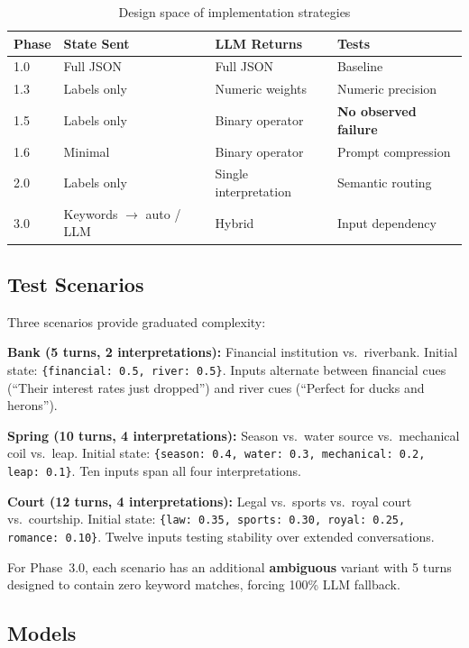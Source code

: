 \documentclass[11pt,a4paper]{article}
\begin{document}
\begin{table}[ht]
\centering
\begin{tabular}{llll}
\toprule
\textbf{Phase} & \textbf{State Sent} & \textbf{LLM Returns} & \textbf{Tests} \\
\midrule
1.0 & Full JSON & Full JSON & Baseline \\
1.3 & Labels only & Numeric weights & Numeric precision \\
1.5 & Labels only & Binary operator & \textbf{No observed failure} \\
1.6 & Minimal & Binary operator & Prompt compression \\
2.0 & Labels only & Single interpretation & Semantic routing \\
3.0 & Keywords $\to$ auto / LLM & Hybrid & Input dependency \\
\bottomrule
\end{tabular}
\caption{Design space of implementation strategies}
\label{tab:design_space}
\end{table}

\subsection{Test Scenarios}

Three scenarios provide graduated complexity:

\textbf{Bank (5 turns, 2 interpretations):}
Financial institution vs.\ riverbank. Initial state:
\texttt{\{financial: 0.5, river: 0.5\}}. Inputs alternate between financial cues
(``Their interest rates just dropped'') and river cues (``Perfect for ducks and herons'').

\textbf{Spring (10 turns, 4 interpretations):}
Season vs.\ water source vs.\ mechanical coil vs.\ leap. Initial state:
\texttt{\{season: 0.4, water: 0.3, mechanical: 0.2, leap: 0.1\}}. Ten inputs
span all four interpretations.

\textbf{Court (12 turns, 4 interpretations):}
Legal vs.\ sports vs.\ royal court vs.\ courtship. Initial state:
\texttt{\{law: 0.35, sports: 0.30, royal: 0.25, romance: 0.10\}}. Twelve inputs
testing stability over extended conversations.

For Phase~3.0, each scenario has an additional \textbf{ambiguous} variant with
5 turns designed to contain zero keyword matches, forcing 100\% LLM fallback.

\subsection{Models}
\end{document}

